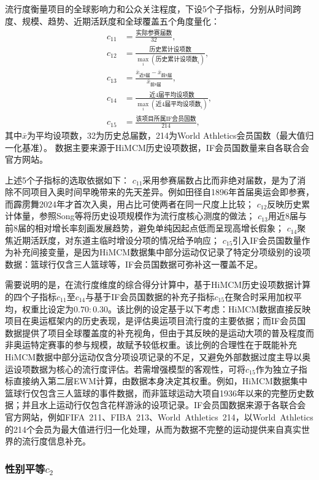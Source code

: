 \documentclass[twoside]{CUGThesis}
\begin{document}
流行度衡量项目的全球影响力和公众关注程度，下设5个子指标，分别从时间跨度、规模、趋势、近期活跃度和全球覆盖五个角度量化：
\begin{align}
c_{11} &= \frac{\text{实际参赛届数}}{32}, \\
c_{12} &= \frac{\text{历史累计设项数}}{\max_i(\text{历史累计设项数}_i)}, \\
c_{13} &= \frac{\bar{x}_{\text{近8届}} - \bar{x}_{\text{前8届}}}{\bar{x}_{\text{前8届}}}, \\
c_{14} &= \frac{\text{近4届平均设项数}}{\max_i(\text{近4届平均设项数}_i)}, \\
c_{15} &= \frac{\text{该项目所属IF会员国数}}{214},
\end{align}
其中$\bar{x}$为平均设项数，32为历史总届数，214为World Athletics会员国数（最大值归一化基准）。
数据主要来源于HiMCM历史设项数据，IF会员国数量来自各联合会官方网站\cite{IOC2024}。

上述5个子指标的选取依据如下：
$c_{11}$采用参赛届数占比而非绝对届数，是为了消除不同项目入奥时间早晚带来的先天差异。例如田径自1896年首届奥运会即参赛，而霹雳舞2024年才首次入奥，用占比可使两者在同一尺度上比较；
$c_{12}$反映历史累计体量，参照Song等\cite{Song2025}将历史设项规模作为流行度核心测度的做法；
$c_{13}$用近8届与前8届的相对增长率刻画发展趋势，避免单纯因起点低而呈现高增长假象；
$c_{14}$聚焦近期活跃度，对东道主临时增设分项的情况给予响应；
$c_{15}$引入IF会员国数量作为补充间接变量，是因为HiMCM数据集中部分运动仅记录了特定分项级别的设项数据：篮球行仅含三人篮球等，IF会员国数据可弥补这一覆盖不足。

需要说明的是，在流行度维度的综合得分计算中，基于HiMCM历史设项数据计算的四个子指标$c_{11}$至$c_{14}$与基于IF会员国数据的补充子指标$c_{15}$在聚合时采用加权平均，权重比设定为$0.70:0.30$。该比例的设定基于以下考虑：HiMCM数据直接反映项目在奥运框架内的历史表现，是评估奥运项目流行度的主要依据；而IF会员国数据提供了项目全球覆盖度的补充视角，但由于其反映的是运动大项的普及程度而非奥运特定赛事的参与规模，故赋予较低权重。该比例的合理性在于既能补充HiMCM数据中部分运动仅含分项设项记录的不足，又避免外部数据过度主导以奥运设项数据为核心的流行度评估。若需增强模型的客观性，可将$c_{15}$作为独立子指标直接纳入第二层EWM计算，由数据本身决定其权重。例如，HiMCM数据集中篮球行仅包含三人篮球的事件数据，而非篮球运动大项自1936年以来的完整历史数据；并且水上运动行仅包含花样游泳的设项记录。IF会员国数据来源于各联合会官方网站，例如FIFA~211、FIBA~213、World~Athletics~214，以World~Athletics的214个会员为最大值进行归一化处理，从而为数据不完整的运动提供来自真实世界的流行度信息补充。

\subsubsection{性别平等$c_2$}
\end{document}
